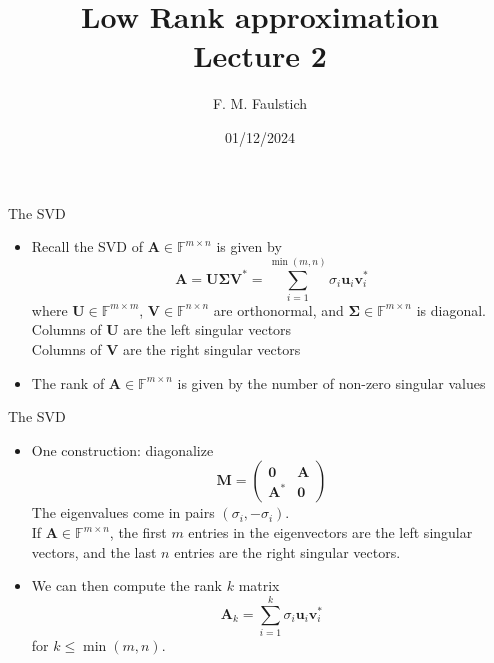 \documentclass{beamer}
\title{
Low Rank approximation\\
Lecture 2
}
\author{F. M. Faulstich}
\date{01/12/2024}
\newcommand{\bgk}[1]{\boldsymbol{#1}}
\newcommand{\bzero}{\bgk{0}}
\newcommand{\bSigma}{\bgk{\Sigma}}
\newcommand{\bvec}[1]{\mathbf{#1}}
\newcommand{\vu}{\bvec{u}}
\newcommand{\vv}{\bvec{v}}
\newcommand{\vA}{\bvec{A}}
\newcommand{\vM}{\bvec{M}}
\newcommand{\vU}{\bvec{U}}
\newcommand{\vV}{\bvec{V}}
\newcommand{\bitem}{\item[$\bullet$]}
\begin{document}
\frame{\titlepage}


\begin{frame}{The SVD}

\begin{itemize}
    \bitem Recall the SVD of $\vA\in \mathbb{F}^{m \times n}$ is given by
    $$
    \vA = \vU \bSigma \vV^* = \sum_{i=1}^{\min(m,n)} \sigma_i\vu_i\vv_i^*
    $$
    where $\vU \in \mathbb{F}^{m \times m}$, $\vV \in \mathbb{F}^{n \times n}$ are orthonormal, and $\bSigma \in \mathbb{F}^{m \times n}$ is diagonal. \\
    Columns of $\vU$ are the left singular vectors\\ 
    Columns of $\vV$ are the right singular vectors 
    \bitem The rank of $\vA \in \mathbb{F}^{m \times n}$ is given by the number of non-zero singular values\\
\end{itemize}
    
\end{frame}

\begin{frame}{The SVD}

\begin{itemize}
    \bitem One construction: diagonalize
    $$
    \vM = 
\begin{pmatrix}
\bzero & \vA\\
\vA^* & \bzero
\end{pmatrix}
    $$
    The eigenvalues come in pairs $(\sigma_i, -\sigma_i)$. \\
    If $\vA\in \mathbb{F}^{m \times n}$, the first $m$ entries in the eigenvectors are the left singular vectors, and the last $n$ entries are the right singular vectors.
    \bitem We can then compute the rank $k$ matrix
    $$
    \vA_k  
    = \sum_{i=1}^{k} \sigma_i\vu_i\vv_i^*
    $$
    for $k\leq \min(m,n)$.
\end{itemize}
    
\end{frame}
\end{document}
